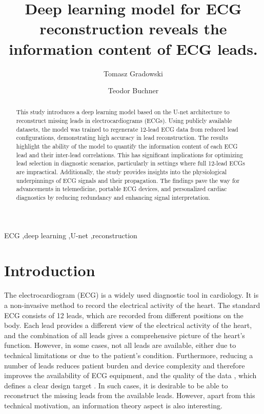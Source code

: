 \documentclass[preprint,12pt]{elsarticle}
\begin{document}
\begin{frontmatter}

\title{Deep learning model for ECG reconstruction reveals the information content of ECG leads.}

\author{Tomasz Gradowski}
\author{Teodor Buchner}

\begin{abstract}
This study introduces a deep learning model based on the U-net architecture to reconstruct missing leads in electrocardiograms (ECGs). Using publicly available datasets, the model was trained to regenerate 12-lead ECG data from reduced lead configurations, demonstrating high accuracy in lead reconstruction. The results highlight the ability of the model to quantify the information content of each ECG lead and their inter-lead correlations. This has significant implications for optimizing lead selection in diagnostic scenarios, particularly in settings where full 12-lead ECGs are impractical. Additionally, the study provides insights into the physiological underpinnings of ECG signals and their propagation. The findings pave the way for advancements in telemedicine, portable ECG devices, and personalized cardiac diagnostics by reducing redundancy and enhancing signal interpretation.
\end{abstract}

\begin{keyword}
ECG \sep deep learning \sep U-net \sep reconstruction
\end{keyword}

\end{frontmatter}


\section{Introduction}
\label{sec:introduction}
The electrocardiogram (ECG) is a widely used diagnostic tool in cardiology. It is a non-invasive method to record the electrical activity of the heart. The standard ECG consists of 12 leads, which are recorded from different positions on the body. Each lead provides a different view of the electrical activity of the heart, and the combination of all leads gives a comprehensive picture of the heart's function. However, in some cases, not all leads are available, either due to technical limitations or due to the patient's condition. Furthermore, reducing a number of leads reduces patient burden and device complexity and therefore improves the availability of ECG equipment, and the quality of the data \cite{Yoo2023}, which defines a clear design target \cite{Xue2024}. In such cases, it is desirable to be able to reconstruct the missing leads from the available leads. However, apart from this technical motivation, an information theory aspect is also interesting.
\end{document}

